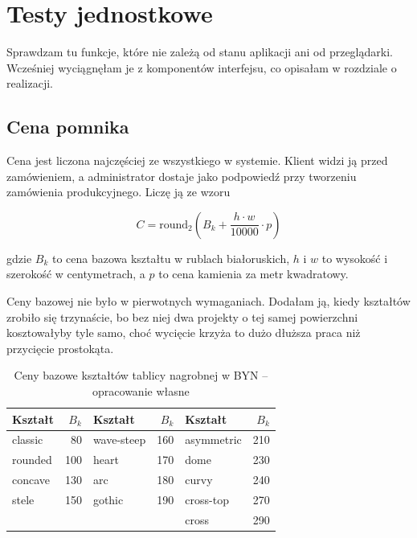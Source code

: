 \section{Testy jednostkowe}
\label{sec:testy-jednostkowe}

Sprawdzam tu funkcje, które nie zależą od stanu aplikacji ani od przeglądarki. Wcześniej wyciągnęłam je z komponentów interfejsu, co opisałam w rozdziale o realizacji.

\subsection{Cena pomnika}
\label{ssec:wycena}

Cena jest liczona najczęściej ze wszystkiego w systemie. Klient widzi ją przed zamówieniem, a administrator dostaje jako podpowiedź przy tworzeniu zamówienia produkcyjnego. Liczę ją ze wzoru

\begin{equation}
\label{eq:cena}
C = \mathrm{round}_2\!\left(B_k + \frac{h \cdot w}{10000} \cdot p\right)
\end{equation}

gdzie $B_k$ to cena bazowa kształtu w rublach białoruskich, $h$ i $w$ to wysokość i szerokość w centymetrach, a $p$ to cena kamienia za metr kwadratowy.

Ceny bazowej nie było w pierwotnych wymaganiach. Dodałam ją, kiedy kształtów zrobiło się trzynaście, bo bez niej dwa projekty o tej samej powierzchni kosztowałyby tyle samo, choć wycięcie krzyża to dużo dłuższa praca niż przycięcie prostokąta.

\begin{table}[htbp]
\centering
\caption{Ceny bazowe kształtów tablicy nagrobnej w BYN -- opracowanie własne}
\label{tab:ceny-bazowe}
\begin{tabular}{|l|r|l|r|l|r|}
\hline
\textbf{Kształt} & $B_k$ & \textbf{Kształt} & $B_k$ & \textbf{Kształt} & $B_k$ \\
\hline
classic & 80 & wave-steep & 160 & asymmetric & 210 \\
rounded & 100 & heart & 170 & dome & 230 \\
concave & 130 & arc & 180 & curvy & 240 \\
stele & 150 & gothic & 190 & cross-top & 270 \\
 & & & & cross & 290 \\
\hline
\end{tabular}
\end{table}

